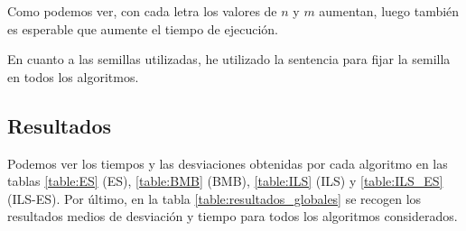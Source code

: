 \documentclass[10pt,a4paper]{article}
\begin{document}
Como podemos ver, con cada letra los valores de $n$ y $m$ aumentan, luego también es esperable que aumente el tiempo de ejecución.

En cuanto a las semillas utilizadas, he utilizado la sentencia  para fijar la semilla en todos los algoritmos.




\subsection{Resultados}

Podemos ver los tiempos y las desviaciones obtenidas por cada algoritmo en las tablas \ref{table:ES} (ES), \ref{table:BMB} (BMB), \ref{table:ILS} (ILS) y \ref{table:ILS_ES} (ILS-ES). Por último, en la tabla \ref{table:resultados_globales} se recogen los resultados medios de desviación y tiempo para todos los algoritmos considerados.\\
\end{document}
